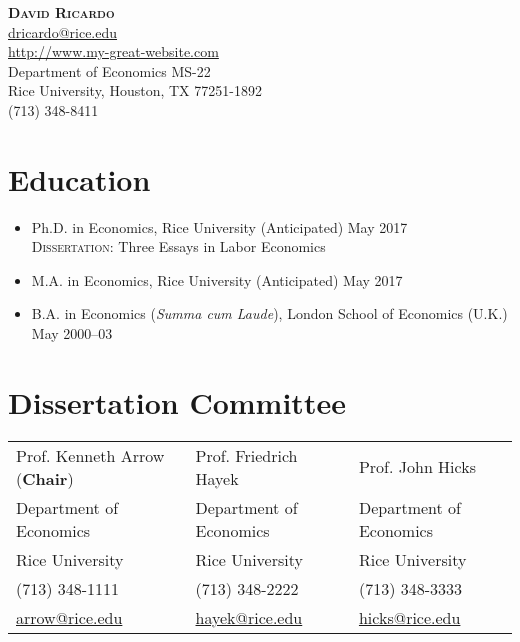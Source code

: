 \documentclass{article}[12]
\makeatletter
\newcommand{\forceindent}{\leavevmode{\parindent=24pt\indent}}
\newcommand{\email}[1]{\href{mailto:#1}{#1}}
\newcommand{\myname}{David Ricardo}
\newcommand{\myemail}{dricardo@rice.edu}
\newcommand{\mywebsite}{http://www.my-great-website.com}
\newcommand{\myphone}{(713) 348-8411}
\newcommand{\myaddress}{Department of Economics MS-22 \\ 
Rice University, Houston, TX 77251-1892}
\makeatother
\begin{document}
\thispagestyle{empty}

\begin{center}
{\bfseries\Large\scshape \myname} \\[4pt]
\email{\myemail} \\ \url{\mywebsite} \\ \myaddress \\ \myphone
\end{center}
 
\vspace{-0.5cm} 


\section{Education}

\begin{itemize}
    \item Ph.D. in Economics, Rice University  \hfill (Anticipated) May 2017  \\
    \forceindent \textsc{Dissertation}: Three Essays in Labor Economics 

    \item M.A. in Economics, Rice University  \hfill (Anticipated) May 2017 

    \item B.A. in Economics (\emph{Summa cum Laude}), London School of Economics (U.K.)  \hfill    May 2000--03 
\end{itemize}

\section{Dissertation Committee}

\begin{tabularx}{\textwidth}{@{}XXX@{}}
Prof. Kenneth Arrow (\textbf{Chair}) & Prof. Friedrich Hayek   & Prof. John Hicks        \\
Department of Economics              & Department of Economics & Department of Economics \\
Rice University                      & Rice University         & Rice University         \\
(713) 348-1111                       & (713) 348-2222          & (713) 348-3333          \\
\email{arrow@rice.edu}               & \email{hayek@rice.edu}  & \email{hicks@rice.edu}
\end{tabularx}
\end{document}
